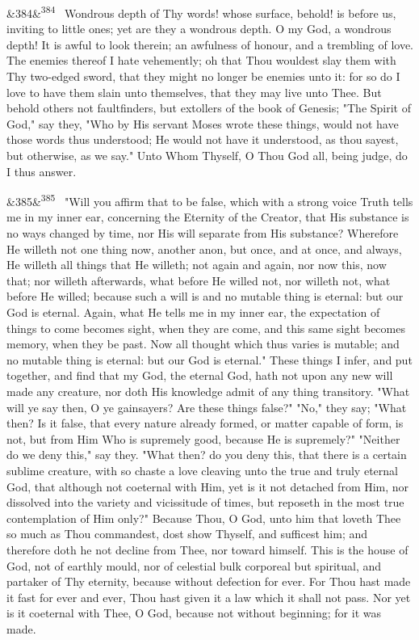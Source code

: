 \documentclass[12pt]{article}
\newcommand{\para}[1][]{\par\noindent\ifx&#1&\else\textsuperscript{\footnotesize #1}~\fi}
\begin{document}
\para[384] Wondrous depth of Thy words! whose surface, behold! is before us, inviting to little ones; yet are they a wondrous depth. O my God, a wondrous depth! It is awful to look therein; an awfulness of honour, and a trembling of love. The enemies thereof I hate vehemently; oh that Thou wouldest slay them with Thy two-edged sword, that they might no longer be enemies unto it: for so do I love to have them slain unto themselves, that they may live unto Thee. But behold others not faultfinders, but extollers of the book of Genesis; "The Spirit of God," say they, "Who by His servant Moses wrote these things, would not have those words thus understood; He would not have it understood, as thou sayest, but otherwise, as we say." Unto Whom Thyself, O Thou God all, being judge, do I thus answer.

\para[385] "Will you affirm that to be false, which with a strong voice Truth tells me in my inner ear, concerning the Eternity of the Creator, that His substance is no ways changed by time, nor His will separate from His substance? Wherefore He willeth not one thing now, another anon, but once, and at once, and always, He willeth all things that He willeth; not again and again, nor now this, now that; nor willeth afterwards, what before He willed not, nor willeth not, what before He willed; because such a will is and no mutable thing is eternal: but our God is eternal. Again, what He tells me in my inner ear, the expectation of things to come becomes sight, when they are come, and this same sight becomes memory, when they be past. Now all thought which thus varies is mutable; and no mutable thing is eternal: but our God is eternal." These things I infer, and put together, and find that my God, the eternal God, hath not upon any new will made any creature, nor doth His knowledge admit of any thing transitory. "What will ye say then, O ye gainsayers? Are these things false?" "No," they say; "What then? Is it false, that every nature already formed, or matter capable of form, is not, but from Him Who is supremely good, because He is supremely?" "Neither do we deny this," say they. "What then? do you deny this, that there is a certain sublime creature, with so chaste a love cleaving unto the true and truly eternal God, that although not coeternal with Him, yet is it not detached from Him, nor dissolved into the variety and vicissitude of times, but reposeth in the most true contemplation of Him only?" Because Thou, O God, unto him that loveth Thee so much as Thou commandest, dost show Thyself, and sufficest him; and therefore doth he not decline from Thee, nor toward himself. This is the house of God, not of earthly mould, nor of celestial bulk corporeal but spiritual, and partaker of Thy eternity, because without defection for ever. For Thou hast made it fast for ever and ever, Thou hast given it a law which it shall not pass. Nor yet is it coeternal with Thee, O God, because not without beginning; for it was made.
\end{document}
